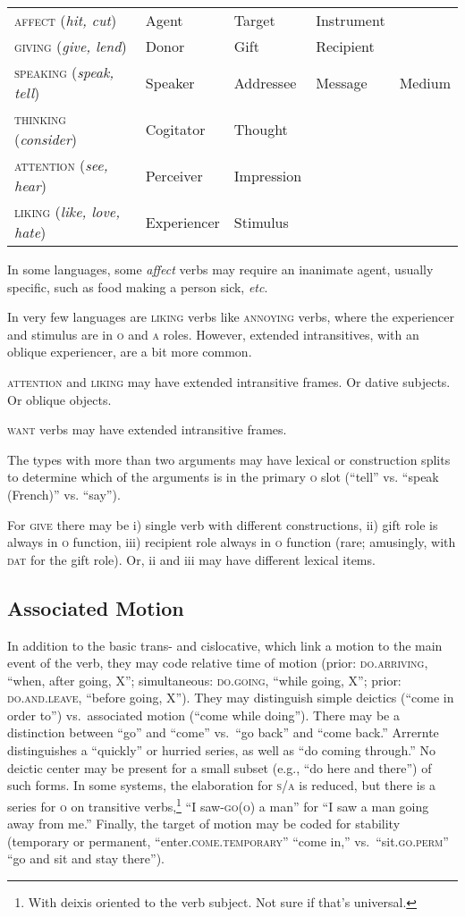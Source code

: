 \documentclass[11pt]{article}
\newcommand{\E}[1]{\textit{#1}}   %
\newcommand{\I}[1]{\textsc{#1}}   %
\begin{document}
\begin{center}
\begin{tabular}{lllll}
\I{affect} (\E{hit, cut}) & Agent & Target & Instrument \\
\I{giving} (\E{give, lend}) & Donor & Gift & Recipient \\
\I{speaking} (\E{speak, tell}) & Speaker & Addressee & Message & Medium \\
\I{thinking} (\E{consider}) & Cogitator & Thought \\
\I{attention} (\E{see, hear}) & Perceiver & Impression \\
\I{liking} (\E{like, love, hate}) & Experiencer & Stimulus
\end{tabular}
\end{center}

In some languages, some \E{affect} verbs may require an inanimate
agent, usually specific, such as food making a person sick,
\textit{etc}.

In very few languages are \I{liking} verbs like \I{annoying} verbs,
where the experiencer and stimulus are in \I{o} and \I{a} roles.
However, extended intransitives, with an oblique experiencer, are a
bit more common.

\I{attention} and \I{liking} may have extended intransitive frames.
Or dative subjects.  Or oblique objects.

\I{want} verbs may have extended intransitive frames.

The types with more than two arguments may have lexical or
construction splits to determine which of the arguments is in the
primary \I{o} slot (``tell'' vs. ``speak (French)'' vs. ``say'').

For \I{give} there may be i) single verb with different constructions,
ii) gift role is always in \I{o} function, iii) recipient role always
in \I{o} function (rare; amusingly, with \I{dat} for the gift role).
Or, ii and iii may have different lexical items.


\subsection{Associated Motion}
In addition to the basic trans- and cislocative, which link a motion
to the main event of the verb, they may code relative time of motion
(prior: \I{do.arriving}, ``when, after going, X''; simultaneous:
\I{do.going}, ``while going, X''; prior: \I{do.and.leave}, ``before
going, X''). They may distinguish simple deictics (``come in order
to'') vs.\ associated motion (``come while doing'').  There may be a
distinction between ``go'' and ``come'' vs.\ ``go back'' and ``come
back.''  Arrernte distinguishes a ``quickly'' or hurried series, as
well as ``do coming through.''  No deictic center may be present for a
small subset (e.g., ``do here and there'') of such forms.  In some
systems, the elaboration for \I{s/a} is reduced, but there is a series
for \I{o} on transitive verbs,\footnote{With deixis oriented to the
verb subject.  Not sure if that's universal.} ``I saw-\I{go(o)} a
man'' for ``I saw a man going away from me.''  Finally, the target of
motion may be coded for stability (temporary or permanent,
``enter.\I{come.temporary}'' ``come in,'' vs.\ ``sit.\I{go.perm}''
``go and sit and stay there'').
\end{document}
